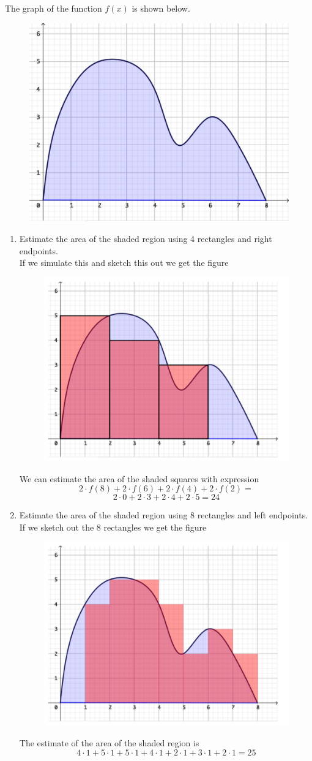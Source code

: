 \documentclass{article}
\begin{document}
The graph of the function $f(x)$ is shown below.
\begin{figure}[H]
  \centering
  \includegraphics[width=.6\linewidth]{base}
\end{figure}
\begin{enumerate}[label=(\alph*)]
\item Estimate the area of the shaded region using 4 rectangles and right endpoints. \\
\newline
If we simulate this and sketch this out we get the figure
\begin{figure}[H]
\centering
\includegraphics[width=.6\linewidth]{endpoint}
\end{figure}
We can estimate the area of the shaded squares with expression
\[2\cdot f(8)+2\cdot f(6)+ 2\cdot f(4)+ 2\cdot f(2)=\]
\[2\cdot0+2\cdot3+2\cdot 4+2\cdot 5=24\]
\newpage
\item Estimate the area of the shaded region using 8 rectangles and left endpoints. \\
\newline
If we sketch out the 8 rectangles we get the figure
\begin{figure}[H]
\centering
\includegraphics[width=.6\linewidth]{endnot}
\end{figure}
The estimate of the area of the shaded region is
\[4\cdot1+5\cdot1+5\cdot1+4\cdot1+2\cdot1+3\cdot1+2\cdot1= 25\]


\end{enumerate}
\end{document}
